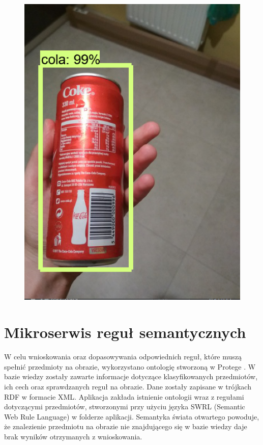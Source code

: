 {{\begin{figure}[htb]
\begin{minipage}{0.57\textwidth}
		\includegraphics[width=\linewidth]{"images/detection_sample_result2"}
	\end{minipage}
\end{figure}
}
\section{Mikroserwis reguł semantycznych}
{
W celu wnioskowania oraz dopasowywania odpowiednich reguł, które muszą spełnić przedmioty na obrazie, wykorzystano ontologię stworzoną w Protege \cite{Protege}. W bazie wiedzy zostały zawarte informacje dotyczące klasyfikowanych przedmiotów, ich cech oraz sprawdzanych reguł na obrazie. Dane zostały zapisane w trójkach RDF w formacie XML. Aplikacja zakłada istnienie ontologii wraz z regułami dotyczącymi przedmiotów, stworzonymi przy użyciu języka SWRL\cite{SWRL} (Semantic Web Rule Language) w folderze aplikacji. Semantyka świata otwartego powoduje, że znalezienie przedmiotu na obrazie nie znajdującego się w bazie wiedzy daje brak wyników otrzymanych z wnioskowania.

}}
